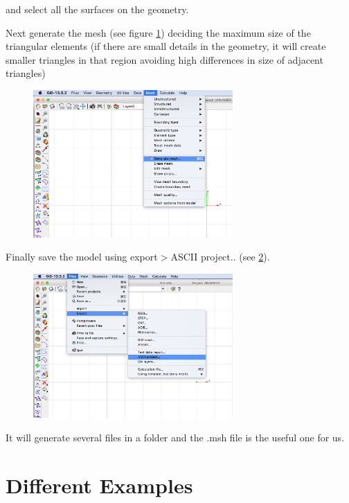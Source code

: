 \documentclass[11pt, oneside]{article}   	%
\begin{document}
and select all the surfaces on the geometry.

Next generate the mesh (see figure \ref{GID_figure_3}) deciding the maximum size of the triangular elements (if there are small details in the geometry, it will create smaller triangles in that region avoiding high differences in size of adjacent triangles) 

\begin{figure}[H]
\begin{center}
\includegraphics[width=3in]{GID_figure_3.png}%
\end{center}
\caption{}
\label{GID_figure_3}
\end{figure}

Finally save the model using export$>$ASCII project.. (see \ref{GID_figure_4}). 

\begin{figure}[H]
\begin{center}
\includegraphics[width=3in]{GID_figure_4.png}%
\end{center}
\caption{}
\label{GID_figure_4}
\end{figure}

It will generate several files in a folder and the .msh file is the useful one for us.

\newpage
\section{Different Examples}
\end{document}
